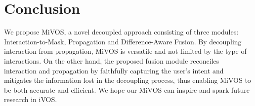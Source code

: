 \documentclass[final]{cvpr}
\begin{document}
\section{Conclusion}
	We propose MiVOS, a novel decoupled approach consisting of three modules: Interaction-to-Mask, Propagation and Difference-Aware Fusion. 
	By decoupling interaction from  propagation, MiVOS is versatile and not limited by the type of interactions. On the other hand, the proposed fusion module reconciles interaction and propagation by faithfully capturing the user's intent and mitigates the information lost in the decoupling process, thus enabling MiVOS to be both accurate and efficient.
	We hope our MiVOS can inspire and spark future research in iVOS.
	
	\newpage
	
	{\small
		
		
	}
	
\end{document}
